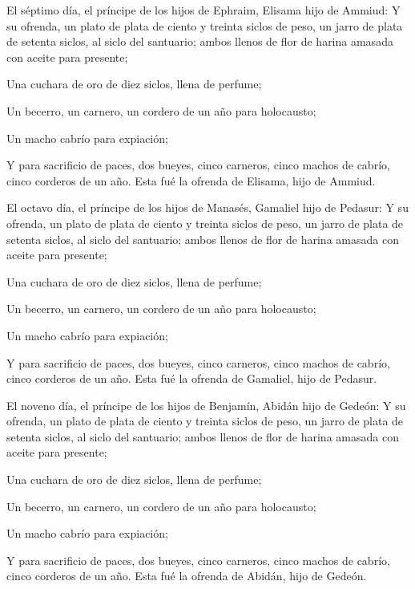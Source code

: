  El séptimo día, el príncipe de los hijos de Ephraim,
Elisama hijo de Ammiud:  Y su ofrenda, un plato de plata
de ciento y treinta siclos de peso, un jarro de plata de setenta siclos,
al siclo del santuario; ambos llenos de flor de harina amasada con
aceite para presente;

 Una cuchara de oro de diez siclos, llena de perfume;

 Un becerro, un carnero, un cordero de un año para
holocausto;

 Un macho cabrío para expiación;

 Y para sacrificio de paces, dos bueyes, cinco carneros,
cinco machos de cabrío, cinco corderos de un año. Esta fué la ofrenda de
Elisama, hijo de Ammiud.

 El octavo día, el príncipe de los hijos de Manasés,
Gamaliel hijo de Pedasur:  Y su ofrenda, un plato de
plata de ciento y treinta siclos de peso, un jarro de plata de setenta
siclos, al siclo del santuario; ambos llenos de flor de harina amasada
con aceite para presente;

 Una cuchara de oro de diez siclos, llena de perfume;

 Un becerro, un carnero, un cordero de un año para
holocausto;

 Un macho cabrío para expiación;

 Y para sacrificio de paces, dos bueyes, cinco carneros,
cinco machos de cabrío, cinco corderos de un año. Esta fué la ofrenda de
Gamaliel, hijo de Pedasur.

 El noveno día, el príncipe de los hijos de Benjamín,
Abidán hijo de Gedeón:  Y su ofrenda, un plato de plata
de ciento y treinta siclos de peso, un jarro de plata de setenta siclos,
al siclo del santuario; ambos llenos de flor de harina amasada con
aceite para presente;

 Una cuchara de oro de diez siclos, llena de perfume;

 Un becerro, un carnero, un cordero de un año para
holocausto;

 Un macho cabrío para expiación;

 Y para sacrificio de paces, dos bueyes, cinco carneros,
cinco machos de cabrío, cinco corderos de un año. Esta fué la ofrenda de
Abidán, hijo de Gedeón.

